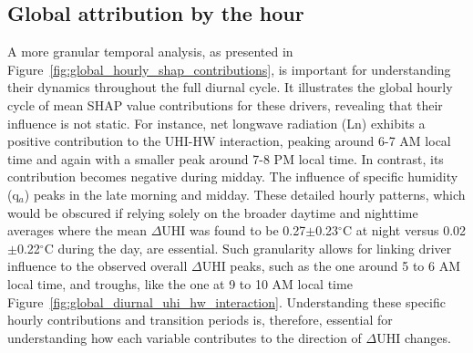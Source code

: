 \subsection*{Global attribution by the hour}
\bgroup
{}
\begin{figure*}[!htbp]
\centering \makeatletter{}
\makeatother 
\caption{{Global hourly cycle of mean SHAP value contributions. The y-axis represents the mean SHAP value contribution (\ensuremath{^\circ}C). Features' SHAP displayed as stacked bars. The solid black line indicates the total model prediction (sum of all mean SHAP contributions plus the base value), while the red dashed line shows the model's base value (0.186 \ensuremath{^\circ}C). Contributions from individual features (G, L\ensuremath{_{n}}, SH, K\ensuremath{_{n}}, q\ensuremath{_{a}}, AHac, \ensuremath{\Theta}\ensuremath{_{10cm}}, U10), as detailed in the legend, are plotted against local hour.}}
\label{fig:global_hourly_shap_contributions}
\end{figure*}
\egroup
A more granular temporal analysis, as presented in Figure~\ref{fig:global_hourly_shap_contributions}, is important for understanding their dynamics throughout the full diurnal cycle. It illustrates the global hourly cycle of mean SHAP value contributions for these drivers, revealing that their influence is not static. For instance, net longwave radiation (Ln\noindent ) exhibits a positive contribution to the UHI-HW interaction, peaking around 6-7 AM local time and again with a smaller peak around 7-8 PM local time. In contrast, its contribution becomes negative during midday. The influence of specific humidity (q\ensuremath{_{a}}) peaks in the late morning and midday. These detailed hourly patterns, which would be obscured if relying solely on the broader daytime and nighttime averages where the mean \ensuremath{\Delta }UHI was found to be 0.27\ensuremath{\pm}0.23\ensuremath{^\circ}C at night versus 0.02\ensuremath{\pm}0.22\ensuremath{^\circ}C during the day, are essential. Such granularity allows for linking driver influence to the observed overall \ensuremath{\Delta }UHI peaks, such as the one around 5 to 6 AM local time, and troughs, like the one at 9 to 10 AM local time Figure~\ref{fig:global_diurnal_uhi_hw_interaction}. Understanding these specific hourly contributions and transition periods is, therefore, essential for understanding how each variable contributes to the direction of \ensuremath{\Delta }UHI changes.

